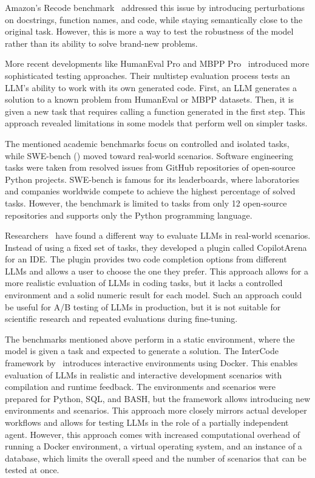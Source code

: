 Amazon's Recode benchmark~\cite{recode_wang2022} addressed this issue by introducing perturbations on docstrings, function names, and code, while staying semantically close to the original task.
However, this is more a way to test the robustness of the model rather than its ability to solve brand-new problems.

More recent developments like HumanEval Pro and MBPP Pro~\cite{yu2024humanevalprombpppro} introduced more sophisticated testing approaches.
Their multistep evaluation process tests an LLM's ability to work with its own generated code.
First, an LLM generates a solution to a known problem from HumanEval or MBPP datasets.
Then, it is given a new task that requires calling a function generated in the first step.
This approach revealed limitations in some models that perform well on simpler tasks.

The mentioned academic benchmarks focus on controlled and isolated tasks, while SWE-bench (\cite{jimenez2024swebenchlanguagemodelsresolve}) moved toward real-world scenarios.
Software engineering tasks were taken from resolved issues from GitHub repositories of open-source Python projects.
SWE-bench is famous for its leaderboards, where laboratories and companies worldwide compete to achieve the highest percentage of solved tasks.
However, the benchmark is limited to tasks from only 12 open-source repositories and supports only the Python programming language.

Researchers~\cite{chi2025copilotarenaplatformcode} have found a different way to evaluate LLMs in real-world scenarios.
Instead of using a fixed set of tasks, they developed a plugin called CopilotArena for an IDE.
The plugin provides two code completion options from different LLMs and allows a user to choose the one they prefer.
This approach allows for a more realistic evaluation of LLMs in coding tasks, but it lacks a controlled environment and a solid numeric result for each model.
Such an approach could be useful for A/B testing of LLMs in production, but it is not suitable for scientific research and repeated evaluations during fine-tuning.

The benchmarks mentioned above perform in a static environment, where the model is given a task and expected to generate a solution.
The InterCode framework by~\cite{yang2023intercodestandardizingbenchmarkinginteractive} introduces interactive environments using Docker.
This enables evaluation of LLMs in realistic and interactive development scenarios with compilation and runtime feedback.
The environments and scenarios were prepared for Python, SQL, and BASH, but the framework allows introducing new environments and scenarios.
This approach more closely mirrors actual developer workflows and allows for testing LLMs in the role of a partially independent agent.
However, this approach comes with increased computational overhead of running a Docker environment, a virtual operating system, and an instance of a database, which limits the overall speed and the number of scenarios that can be tested at once.

